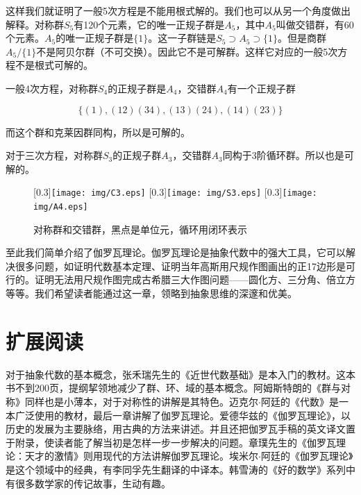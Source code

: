 \documentclass{article}
\begin{document}
这样我们就证明了一般5次方程是不能用根式解的。我们也可以从另一个角度做出解释。对称群$S_5$有120个元素，它的唯一正规子群是$A_5$，其中$A_5$叫做交错群，有60个元素。$A_5$的唯一正规子群是$\{1\}$。这一子群链是$S_5 \supset A_5 \supset \{1\}$。但是商群$A_5/\{1\}$不是阿贝尔群（不可交换）。因此它不是可解群。这样它对应的一般5次方程不是根式可解的。

一般4次方程，对称群$S_4$的正规子群是$A_4$，交错群$A_4$有一个正规子群

\[
\{(1), (1 2)(3 4), (1 3)(2 4), (1 4)(2 3)\}
\]

而这个群和克莱因群同构，所以是可解的。

对于三次方程，对称群$S_3$的正规子群$A_3$，交错群$A_3$同构于3阶循环群。所以也是可解的。

\begin{figure}[htbp]
  \centering
  [0.3\linewidth]{\texttt{[image: img/C3.eps]}} \quad
  [0.3\linewidth]{\texttt{[image: img/S3.eps]}}
  [0.3\linewidth]{\texttt{[image: img/A4.eps]}}
  \caption{对称群和交错群，黑点是单位元，循环用闭环表示}
  \label{fig:group-graph}
\end{figure}

至此我们简单介绍了伽罗瓦理论。伽罗瓦理论是抽象代数中的强大工具，它可以解决很多问题，如证明代数基本定理、证明当年高斯用尺规作图画出的正17边形是可行的。证明无法用尺规作图完成古希腊三大作图问题——圆化方、三分角、倍立方等等。我们希望读者能通过这一章，领略到抽象思维的深邃和优美。

\begin{Exercise}
\end{Exercise}

\section{扩展阅读}

对于抽象代数的基本概念，张禾瑞先生的《近世代数基础》\cite{ZhangHeRui1978}是本入门的教材。这本书不到200页，提纲挈领地减少了群、环、域的基本概念。阿姆斯特朗的《群与对称》\cite{Armstrong1988}同样也是小薄本，对于对称性的讲解是其特色。迈克尔$\cdot$阿廷的《代数》是一本广泛使用的教材，最后一章讲解了伽罗瓦理论。爱德华兹的《伽罗瓦理论》，以历史的发展为主要脉络，用古典的方法来讲述。并且还把伽罗瓦手稿的英文译文置于附录，使读者能了解当初是怎样一步一步解决的问题。章璞先生的《伽罗瓦理论：天才的激情》\cite{ZhangPu2013}则用现代的方法讲解伽罗瓦理论。埃米尔$\cdot$阿廷的《伽罗瓦理论》是这个领域中的经典，有李同孚先生翻译的中译本。韩雪涛的《好的数学》系列中有很多数学家的传记故事，生动有趣。
\end{document}

